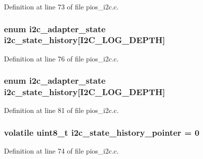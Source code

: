\-Definition at line 73 of file pios\-\_\-i2c.\-c.

\hypertarget{group___p_i_o_s___i2_c_ga207839e0ce4c1011c30ea9254657251c}{
\subsubsection[{i2c\-\_\-state\-\_\-history}]{\setlength{\rightskip}{0pt plus 5cm}enum {\bf i2c\-\_\-adapter\-\_\-state} {\bf i2c\-\_\-state\-\_\-history}\mbox{[}\-I2\-C\-\_\-\-L\-O\-G\-\_\-\-D\-E\-P\-T\-H\mbox{]}}}\label{group___p_i_o_s___i2_c_ga207839e0ce4c1011c30ea9254657251c}


\-Definition at line 76 of file pios\-\_\-i2c.\-c.

\hypertarget{group___p_i_o_s___i2_c_ga207839e0ce4c1011c30ea9254657251c}{
\subsubsection[{i2c\-\_\-state\-\_\-history}]{\setlength{\rightskip}{0pt plus 5cm}enum {\bf i2c\-\_\-adapter\-\_\-state} {\bf i2c\-\_\-state\-\_\-history}\mbox{[}\-I2\-C\-\_\-\-L\-O\-G\-\_\-\-D\-E\-P\-T\-H\mbox{]}}}\label{group___p_i_o_s___i2_c_ga207839e0ce4c1011c30ea9254657251c}


\-Definition at line 81 of file pios\-\_\-i2c.\-c.

\hypertarget{group___p_i_o_s___i2_c_gad02d69a4953e925d905e000697a0d885}{
\subsubsection[{i2c\-\_\-state\-\_\-history\-\_\-pointer}]{\setlength{\rightskip}{0pt plus 5cm}volatile uint8\-\_\-t {\bf i2c\-\_\-state\-\_\-history\-\_\-pointer} = 0}}\label{group___p_i_o_s___i2_c_gad02d69a4953e925d905e000697a0d885}


\-Definition at line 74 of file pios\-\_\-i2c.\-c.

